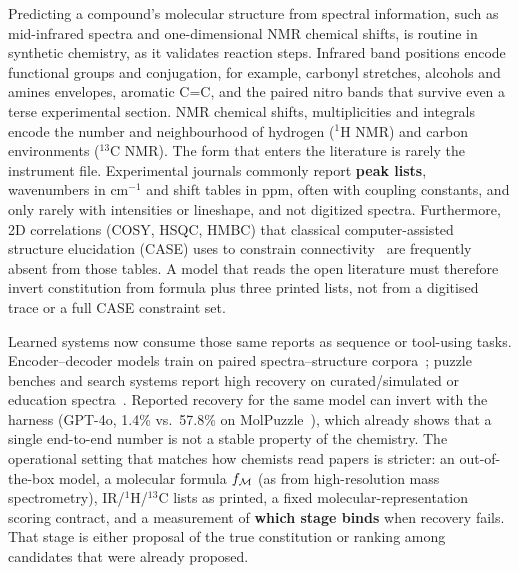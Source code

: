 \documentclass{article}
\begin{document}
Predicting a compound's molecular structure from spectral information, such as mid-infrared spectra and one-dimensional NMR chemical shifts, is routine in synthetic chemistry, as it validates reaction steps. 
Infrared band positions encode functional groups and conjugation, for example,
carbonyl stretches, alcohols and amines envelopes, aromatic C=C, and the paired
nitro bands that survive even a terse experimental section.
NMR chemical shifts, multiplicities and integrals encode the number and
neighbourhood of hydrogen ($^1$H  NMR) and carbon environments ($^{13}$C NMR).
The form that enters the literature is rarely the instrument file.
Experimental journals commonly report \textbf{peak lists}, wavenumbers in cm$^{-1}$ and
shift tables in ppm, often with coupling constants, and only rarely with
intensities or lineshape, and not digitized spectra. 
Furthermore, 2D correlations (COSY, HSQC, HMBC) that classical
computer-assisted structure elucidation (CASE) uses to constrain
connectivity~\citep{elyashberg2012case,elyashberg2015case} are frequently
absent from those tables.
A model that reads the open literature must therefore invert constitution
from formula plus three printed lists, not from a digitised trace or a
full CASE constraint set.

Learned systems now consume those same reports as sequence or tool-using
tasks.
Encoder--decoder models train on paired spectra--structure
corpora~\citep{chacko2024spectro,ottomano2025nmiracle,alberts2024ir};
puzzle benches and search systems report high recovery on curated/simulated or
education spectra~\citep{kamber2026chemist,guo2024molpuzzle,zhuang2025treesearch,espejo2026agentic}.
Reported recovery for the same model can invert with the harness
(GPT-4o, 1.4\% vs.\ 57.8\% on MolPuzzle~\citep{guo2024molpuzzle,zhuang2025treesearch}),
which already shows that a single end-to-end number is not a stable
property of the chemistry.
The operational setting that matches how chemists read papers is stricter:
an out-of-the-box model, a molecular formula $f_{\cal M}$ (as from high-resolution mass
spectrometry), IR/$^1$H/$^{13}$C lists as printed, a fixed
molecular-representation scoring contract, and a measurement of
\textbf{which stage binds} when recovery fails.
That stage is either proposal of the true constitution or ranking among
candidates that were already proposed.
\end{document}
